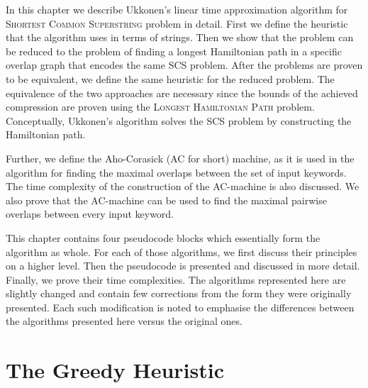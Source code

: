 \documentclass[english,twoside,censored,csm,algorithms-track-2020]{HYthesisML}
\theoremstyle{plain}
\theoremstyle{definition}
\begin{document}
In this chapter we describe Ukkonen's linear time approximation algorithm \citep{Ukkonen90} for
\textsc{Shortest Common Superstring} problem in detail. First we define the heuristic that the
algorithm uses in terms of strings. Then we show that the problem can be reduced to the problem
of finding a longest Hamiltonian path in a specific overlap graph that encodes the same SCS problem.
After the problems are proven to be equivalent, we define the same heuristic for the reduced problem.
The equivalence of the two approaches are necessary since the bounds of the achieved compression
are proven using the \textsc{Longest Hamiltonian Path} problem. Conceptually, Ukkonen's algorithm 
solves the SCS problem by constructing the Hamiltonian path.

Further, we define the Aho-Corasick (AC for short) machine, as it is used in the algorithm for finding
the maximal overlaps between the set of input keywords. The time complexity of the construction of
the AC-machine is also discussed. We also prove that the AC-machine can be used to find the maximal
pairwise overlaps between every input keyword.

This chapter contains four pseudocode blocks which essentially form the algorithm as whole.
For each of those algorithms, we first discuss their principles on a higher level. Then the pseudocode
is presented and discussed in more detail. Finally, we prove their time complexities.
The algorithms represented here are slightly changed and contain few corrections from the form they
were originally presented. Each such modification is noted to emphasise the differences between
the algorithms presented here versus the original ones.

\listofalgorithms

\section{The Greedy Heuristic}

  
\end{document}
